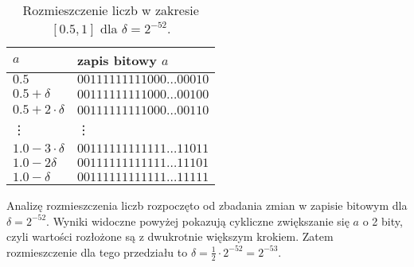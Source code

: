 \documentclass{classrep}
\begin{document}
\begin{enumerate}
			\begin{table}[!h]
        		\centering
        		\footnotesize
            	\begin{tabular}{ll} \toprule
                	$a$ & {zapis bitowy $a$} \\ \midrule
                	$0.5$ & $00111111111000\dots00010$ \\ 
 					$0.5+\delta$ & $00111111111000\dots00100$ \\
 					$0.5+2\cdot\delta$ & $00111111111000\dots00110$ \\
 					\vdots & \vdots \\
 					$1.0-3\cdot\delta$ & $00111111111111\dots11011$ \\
 					$1.0-2\delta$ & $00111111111111\dots11101$ \\
 					$1.0-\delta$ & $00111111111111\dots11111$ \\\bottomrule
            	\end{tabular}
            	\caption{Rozmieszczenie liczb w zakresie $[0.5,1]$ dla $\delta = 2^{-52}$.}
			\label{table:6}
   			\end{table}
			
			Analizę rozmieszczenia liczb rozpoczęto od zbadania zmian w zapisie bitowym dla $\delta = 2^{-52}$. Wyniki 
			widoczne powyżej pokazują cykliczne zwiększanie się $a$ o 2 bity, czyli wartości rozłożone są z dwukrotnie 
			większym krokiem. Zatem rozmieszczenie dla tego przedziału to $\delta = \frac{1}{2} \cdot 2^{-52} = 2^{-53}$.
			\newline
				

\end{enumerate}
\end{document}
